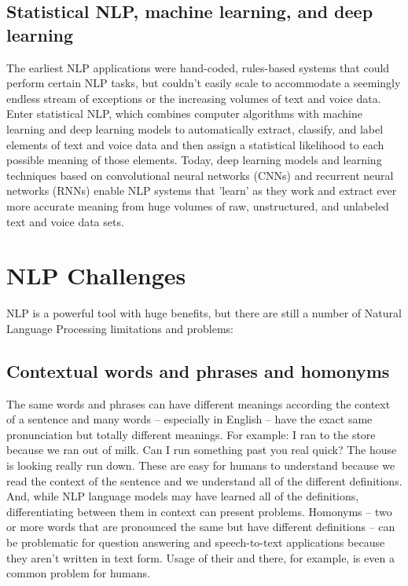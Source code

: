 \documentclass[11pt]{article}
\begin{document}
\subsection{Statistical NLP, machine learning, and deep learning}
\label{sec:org0f8a61a}
The earliest NLP applications were hand-coded, rules-based systems that could perform
certain NLP tasks, but couldn't easily scale to accommodate a seemingly endless stream
of exceptions or the increasing volumes of text and voice data.
Enter statistical NLP, which combines computer algorithms with machine learning and
deep learning models to automatically extract, classify, and label elements of text
and voice data and then assign a statistical likelihood to each possible meaning of
those elements. Today, deep learning models and learning techniques based on
convolutional neural networks (CNNs) and recurrent neural networks (RNNs) enable
NLP systems that 'learn' as they work and extract ever more accurate meaning from
huge volumes of raw, unstructured, and unlabeled text and voice data sets. 
\clearpage

\section{NLP Challenges}
\label{sec:org21128ad}
NLP is a powerful tool with huge benefits, but there are still a number of Natural
Language Processing limitations and problems:
\subsection{Contextual words and phrases and homonyms}
\label{sec:orgd3349ee}
The same words and phrases can have different meanings according the context of a sentence and many words – especially in English – have the exact same pronunciation but totally different meanings.
For example:
I ran to the store because we ran out of milk.
Can I run something past you real quick?
The house is looking really run down.
These are easy for humans to understand because we read the context of the sentence and we understand all of the different definitions. And, while NLP language models may have learned all of the definitions, differentiating between them in context can present problems.
Homonyms – two or more words that are pronounced the same but have different definitions – can be problematic for question answering and speech-to-text applications because they aren’t written in text form. Usage of their and there, for example, is even a common problem for humans.  
\end{document}
